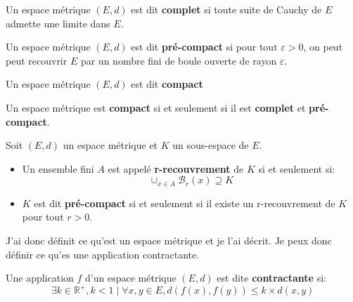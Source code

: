 \documentclass[a4paper, 12pt]{report}
\begin{document}
			\begin{definition}
				Un espace métrique $(E,d)$ est dit \textbf{complet} si toute suite de Cauchy de $E$ admette une limite dans $E$.
				\label{espMetriqueDef}
			\end{definition}
			
			\begin{definition}
				Un espace métrique $(E,d)$ est dit \textbf{pré-compact} si pour tout $\varepsilon >0$, on peut peut recouvrir $E$ par un nombre fini de boule ouverte de rayon $\varepsilon$.
			\end{definition}
			
			\begin{definition}
				Un espace métrique $(E,d)$ est dit \textbf{compact} 
			\end{definition}
			
			\begin{prop}
				Un espace métrique est \textbf{compact} si et seulement si il est \textbf{complet} et \textbf{pré-compact}.
			\end{prop}
			
			\begin{definition}
				Soit $(E,d)$ un espace métrique et $K$ un sous-espace de $E$.
				\begin{itemize}
					\item Un ensemble fini $A$ est appelé \textbf{r-recouvrement} de $K$ si et seulement si:
					\begin{equation*}
						\cup_{x\in A} \mathcal{B}_r(x)\supseteq K
					\end{equation*}
					\item $K$ est dit \textbf{pré-compact} si et seulement si il existe un r-recouvrement de $K$ pour tout $r>0$.

				\end{itemize}

			\end{definition}

			\hspace{.7 cm}
			J'ai donc définit ce qu'est un espace métrique et je l'ai décrit. Je peux donc définir ce qu'es une application contractante.
			\begin{definition}
				Une application $f$ d'un espace métrique $(E,d)$ est dite \textbf{contractante} si:
				\begin{equation}
					\exists k\in\mathds{R}^+, k<1 \mid \forall x,y\in E, d(f(x),f(y))\leqslant k\times d(x,y)
					\label{Pcontractante}
				\end{equation}
			\end{definition}
			
\end{document}
